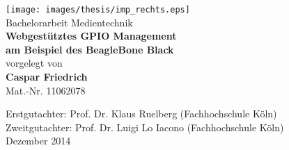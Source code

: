\begin{titlepage}
\begin{center}

\texttt{[image: images/thesis/imp\_rechts.eps]}\\[3cm]

Bachelorarbeit Medientechnik\\[0.5cm]
{\sffamily \bfseries \Huge Webgestütztes GPIO Management\\[0.25cm]
am Beispiel des BeagleBone Black}\\[2cm]

vorgelegt von\\[0.5cm]
\textbf{Caspar Friedrich}\\[0.5cm]
Mat.-Nr. 11062078\\[0.5cm]

\vfill

Erstgutachter: Prof. Dr. Klaus Ruelberg (Fachhochschule Köln)\\[0.5cm]
Zweitgutachter: Prof. Dr. Luigi Lo Iacono (Fachhochschule Köln)\\[0.5cm]
Dezember 2014

\end{center}
\end{titlepage}
